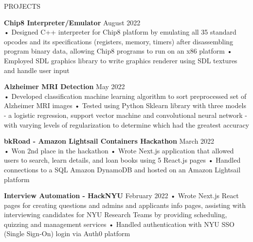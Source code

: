 \documentclass{resume} %
\begin{document}
\begin{rSection}{PROJECTS}

\textbf{Chip8 Interpreter/Emulator } \hfill August 2022 \\
• Designed C++ interpreter for Chip8 platform by emulating all 35 standard opcodes and its specifications (registers, memory, timers) after disassembling program binary data, allowing Chip8 programs to run on an x86 platform \newline
• Employed SDL graphics library to write graphics renderer using SDL textures and handle user input \smallskip

\textbf{Alzheimer MRI Detection } \hfill May 2022 \\
• Developed classification machine learning algorithm to sort preprocessed set of Alzheimer MRI images
\newline
• Tested using Python Sklearn library with three models - a logistic regression, support vector machine and convolutional neural network - with varying levels of regularization to determine which had the greatest accuracy 

\textbf{bkRoad - Amazon Lightsail Containers Hackathon } \hfill March 2022 \\
• Won 2nd place in the hackathon \newline
• Wrote Next.js application that allowed users to search, learn details, and loan books using 5 React.js pages \newline
• Handled connections to a SQL Amazon DynamoDB and hosted on an Amazon Lightsail platform

\textbf{Interview Automation - HackNYU} \hfill February 2022 \newline
• Wrote Next.js React pages for creating questions and admins and  applicants info pages, assisting with interviewing candidates for NYU Research Teams by providing scheduling, quizzing and management services\newline
• Handled authentication with NYU SSO (Single Sign-On) login via Auth0 platform  \smallskip

\end{rSection} 



\end{document}
